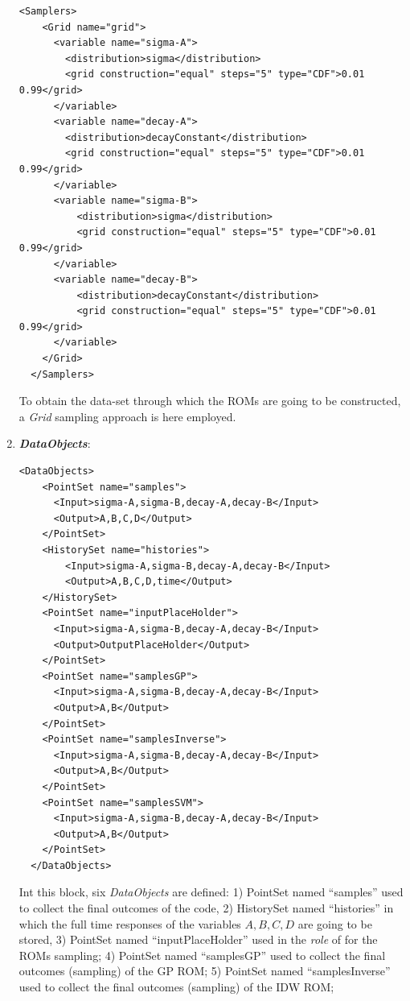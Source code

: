 \begin{enumerate}
\begin{lstlisting}[style=XML,morekeywords={arg,extension,pauseAtEnd,overwrite}]
  <Samplers>
    <Grid name="grid">
      <variable name="sigma-A">
        <distribution>sigma</distribution>
        <grid construction="equal" steps="5" type="CDF">0.01 0.99</grid>
      </variable>
      <variable name="decay-A">
        <distribution>decayConstant</distribution>
        <grid construction="equal" steps="5" type="CDF">0.01 0.99</grid>
      </variable>
      <variable name="sigma-B">
          <distribution>sigma</distribution>
          <grid construction="equal" steps="5" type="CDF">0.01 0.99</grid>
      </variable>
      <variable name="decay-B">
          <distribution>decayConstant</distribution>
          <grid construction="equal" steps="5" type="CDF">0.01 0.99</grid>
      </variable>
    </Grid>
  </Samplers>
\end{lstlisting}
  To obtain the data-set through which the ROMs are going to be
  constructed, a \textit{Grid} sampling approach is here employed.
   \item \textbf{\textit{DataObjects}}:
\begin{lstlisting}[style=XML,morekeywords={arg,extension,pauseAtEnd,overwrite}]
  <DataObjects>
    <PointSet name="samples">
      <Input>sigma-A,sigma-B,decay-A,decay-B</Input>
      <Output>A,B,C,D</Output>
    </PointSet>
    <HistorySet name="histories">
        <Input>sigma-A,sigma-B,decay-A,decay-B</Input>
        <Output>A,B,C,D,time</Output>
    </HistorySet>
    <PointSet name="inputPlaceHolder">
      <Input>sigma-A,sigma-B,decay-A,decay-B</Input>
      <Output>OutputPlaceHolder</Output>
    </PointSet> 
    <PointSet name="samplesGP">
      <Input>sigma-A,sigma-B,decay-A,decay-B</Input>
      <Output>A,B</Output>
    </PointSet>
    <PointSet name="samplesInverse">
      <Input>sigma-A,sigma-B,decay-A,decay-B</Input>
      <Output>A,B</Output>
    </PointSet>
    <PointSet name="samplesSVM">
      <Input>sigma-A,sigma-B,decay-A,decay-B</Input>
      <Output>A,B</Output>
    </PointSet>
  </DataObjects>
\end{lstlisting}
  Int this block, six \textit{DataObjects} are defined: 1) PointSet 
  named ``samples'' used to collect the final outcomes of the code, 2) 
  HistorySet named ``histories'' in which the full time responses of the 
  variables $A,B,C,D$ are going to be stored, 3) PointSet named    
  ``inputPlaceHolder'' used in the \textit{role} of  for the ROMs sampling;
  4) PointSet named ``samplesGP'' used to collect the final outcomes (sampling) of the GP ROM;
  5) PointSet named ``samplesInverse'' used to collect the final outcomes (sampling) of the IDW ROM;

\end{enumerate}
